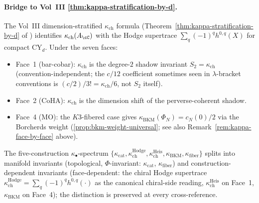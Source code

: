 \paragraph{Bridge to Vol~III \ref{thm:kappa-stratification-by-d}.}
The Vol~III dimension-stratified $\kappa_{\mathrm{ch}}$ formula
(Theorem~\ref{thm:kappa-stratification-by-d} of
\cite{VolI})
identifies $\kappa_{\mathrm{ch}}(A_\cC)$ with the Hodge supertrace
$\sum_q (-1)^q h^{0,q}(X)$ for compact CY$_d$. Under the seven faces:
\begin{itemize}
\item Face~1 (bar-cobar): $\kappa_{\mathrm{ch}}$ is the degree-$2$
shadow invariant $S_2 = \kappa_{\mathrm{ch}}$ (convention-independent;
the $c/12$ coefficient sometimes seen in $\lambda$-bracket conventions
is $(c/2)/3! = \kappa_{\mathrm{ch}}/6$, not $S_2$ itself).
\item Face~2 (CoHA): $\kappa_{\mathrm{ch}}$ is the dimension shift
of the perverse-coherent shadow.
\item Face~4 (MO): the $K3$-fibered case gives $\kappa_{\mathrm{BKM}}(\Phi_N) = c_N(0)/2$
via the Borcherds weight (\ref{prop:bkm-weight-universal}; see
also Remark~\ref{rem:kappa-face-by-face} above).
\end{itemize}
The five-construction $\kappa_\bullet$-spectrum
$\{\kappa_{\mathrm{cat}}, \kappa_{\mathrm{ch}}^{\mathrm{Hodge}}, \kappa_{\mathrm{ch}}^{\mathrm{Heis}}, \kappa_{\mathrm{BKM}}, \kappa_{\mathrm{fiber}}\}$
splits into manifold invariants (topological,
$\Phi$-invariant: $\kappa_{\mathrm{cat}}$, $\kappa_{\mathrm{fiber}}$)
and construction-dependent invariants (face-dependent: the chiral
Hodge supertrace $\kappa_{\mathrm{ch}}^{\mathrm{Hodge}} =
\sum_q (-1)^q h^{0,q}(\cdot)$ as the canonical chiral-side reading,
$\kappa_{\mathrm{ch}}^{\mathrm{Heis}}$
on Face~1, $\kappa_{\mathrm{BKM}}$ on Face~4); the distinction is
preserved at every cross-reference.

